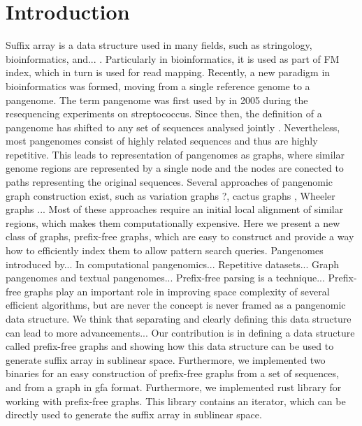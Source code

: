 \section{Introduction}
Suffix array is a data structure used in many fields, such as stringology,
bioinformatics, and... .
Particularly in bioinformatics, it is used as part of FM index, which in turn
is used for read mapping.
Recently, a new paradigm in bioinformatics was formed, moving from a single
reference genome to a pangenome.
The term pangenome was first used by \citet{tettelin2005genome} in 2005 during the
resequencing experiments on streptococcus.
Since then, the definition of a pangenome has shifted to any set of sequences
analysed jointly \cite{computational2018computational}.
Nevertheless, most pangenomes consist of highly related sequences and thus are
highly repetitive.
This leads to representation of pangenomes as graphs, where similar genome
regions are represented by a single node and the nodes are conected to paths
representing the original sequences.
Several approaches of pangenomic graph construction exist, such as variation
graphs \cite{church2015extending}?, cactus graphs \cite{paten2011cactus}, 
Wheeler graphs \cite{gagie2017wheeler} ...
Most of these approaches require an initial local alignment of similar regions,
which makes them computationally expensive.
Here we present a new class of graphs, prefix-free graphs, which are easy to
construct and provide a way how to efficiently index them to allow pattern 
search queries.
Pangenomes introduced by...
In computational pangenomics...
Repetitive datasets...
Graph pangenomes and textual pangenomes...
Prefix-free parsing is a technique...
Prefix-free graphs play an important role in improving space
complexity of several efficient algorithms, but are never the concept is never
framed as a pangenomic data structure.
We think that separating and clearly defining this data structure can lead to
more advancements...
Our contribution is in defining a data structure called prefix-free graphs and
showing how this data structure can be used to generate suffix array in
sublinear space.
Furthermore, we implemented two binaries for an easy construction of prefix-free
graphs from a set of sequences, and from a graph in gfa format.
Furthermore, we implemented rust library for working with prefix-free graphs.
This library contains an iterator, which can be directly used to generate the 
suffix array in sublinear space.


